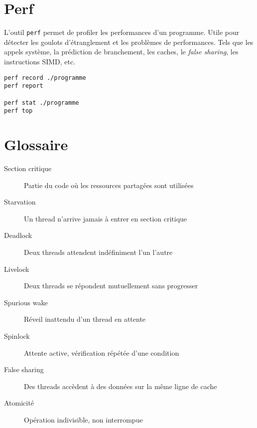 \documentclass{article}
\newcommand{\cd}{\lstinline}
\begin{document}
\begin{multicols*}{3}
\section*{Perf}
L'outil \cd{perf} permet de profiler les performances d'un programme.
Utile pour détecter les goulots d'étranglement et les problèmes de performances.
Tels que les appels système, la prédiction de branchement, les caches,
le \emph{false sharing}, les instructions SIMD, etc.

\begin{lstlisting}
perf record ./programme
perf report

perf stat ./programme
perf top
\end{lstlisting}

\section*{Glossaire}
\begin{description}
    \item[Section critique] Partie du code où les ressources partagées sont utilisées
    \item[Starvation] Un thread n'arrive jamais à entrer en section critique
    \item[Deadlock] Deux threads attendent indéfiniment l'un l'autre
    \item[Livelock] Deux threads se répondent mutuellement sans progresser
    \item[Spurious wake] Réveil inattendu d'un thread en attente
    \item[Spinlock] Attente active, vérification répétée d'une condition
    \item[False sharing] Des threads accèdent à des données sur la même ligne de cache
    \item[Atomicité] Opération indivisible, non interrompue
\end{description}
\end{multicols*}
\end{document}
